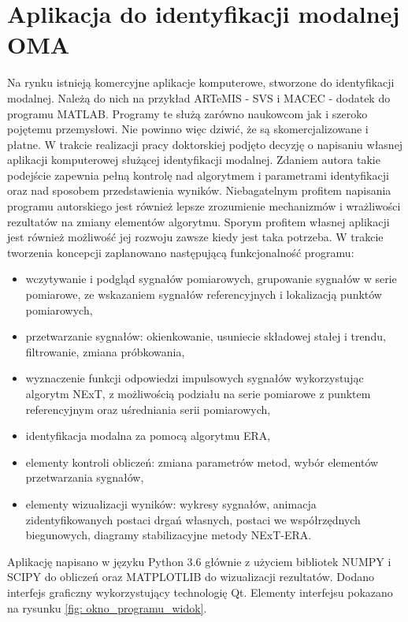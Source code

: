 \section{Aplikacja do identyfikacji modalnej OMA} \label{sect: OMA_application}
Na rynku istnieją komercyjne aplikacje komputerowe, stworzone do identyfikacji modalnej. Należą do nich na przykład ARTeMIS - SVS i MACEC - dodatek do programu MATLAB. Programy te służą zarówno naukowcom jak i szeroko pojętemu przemysłowi. Nie powinno więc dziwić, że są skomercjalizowane i płatne. W trakcie realizacji pracy doktorskiej podjęto decyzję o napisaniu własnej aplikacji komputerowej służącej identyfikacji modalnej. Zdaniem autora takie podejście zapewnia pełną kontrolę nad algorytmem i parametrami identyfikacji oraz nad sposobem przedstawienia wyników. Niebagatelnym profitem napisania programu autorskiego jest również lepsze zrozumienie mechanizmów i wrażliwości rezultatów na zmiany elementów algorytmu. Sporym profitem własnej aplikacji jest również możliwość jej rozwoju zawsze kiedy jest taka potrzeba. 
W trakcie tworzenia koncepcji zaplanowano następującą funkcjonalność programu:
\begin{itemize}
	\item wczytywanie i podgląd sygnałów pomiarowych, grupowanie sygnałów w serie pomiarowe, ze wskazaniem sygnałów referencyjnych i lokalizacją punktów pomiarowych,
	\item przetwarzanie sygnałów: okienkowanie, usuniecie składowej stałej i trendu, filtrowanie, zmiana próbkowania,
	\item wyznaczenie funkcji odpowiedzi impulsowych sygnałów wykorzystując algorytm NExT, z możliwością podziału na serie pomiarowe z punktem referencyjnym oraz uśredniania serii pomiarowych,
	\item identyfikacja modalna za pomocą algorytmu ERA,
	\item elementy kontroli obliczeń: zmiana parametrów metod, wybór elementów przetwarzania sygnałów,
	\item elementy wizualizacji wyników: wykresy sygnałów, animacja zidentyfikowanych postaci drgań własnych, postaci we współrzędnych biegunowych, diagramy stabilizacyjne metody NExT-ERA.
\end{itemize}
Aplikację napisano w języku Python 3.6 głównie z użyciem bibliotek NUMPY i SCIPY do obliczeń oraz MATPLOTLIB do wizualizacji rezultatów. Dodano interfejs graficzny wykorzystujący technologię Qt. Elementy interfejsu pokazano na rysunku \ref{fig: okno_programu_widok}.

